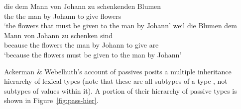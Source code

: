 \documentclass[output=paper
 	        ,biblatex
                ,babelshorthands
                ,newtxmath
                ,draftmode
                ,colorlinks, citecolor=brown
]{langscibook}
\begin{document}
\begin{exe}
	\ex\label{zu-pass}
	\begin{xlist}
		\ex\label{zu-pass-a}
		\gll die dem Mann von Johann zu schenkenden Blumen \\
		the the man by Johann to give flowers  \\
		\glt `the flowers that must be given to the man by Johann'
		\ex\label{zu-pass-b}
		\gll weil die Blumen dem Mann von Johann zu schenken sind \\
		because the flowers the man by Johann to give are \\
		\glt `because the flowers must be given to the man by Johann'
	\end{xlist}
\end{exe}

Ackerman \& Webelhuth's account of  passives posits a multiple inheritance hierarchy of lexical types (note that these are all subtypes of a type , not subtypes of values within it). A portion of their hierarchy of  passive types is shown in Figure~\ref{fig:pass-hier}.
\end{document}
